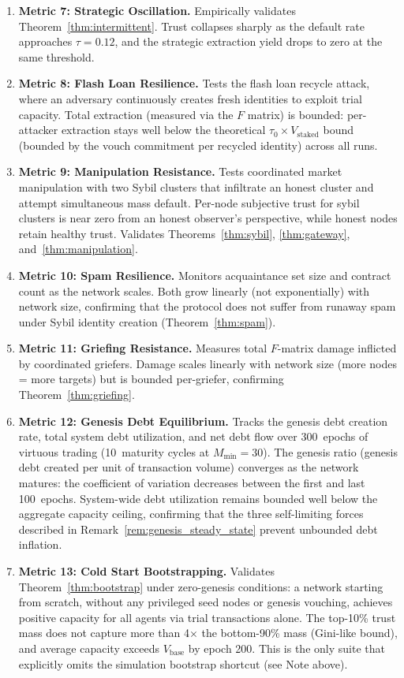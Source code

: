\documentclass[11pt]{article}
\begin{document}
\begin{enumerate}
    \item \textbf{Metric 7: Strategic Oscillation.} Empirically validates Theorem~\ref{thm:intermittent}. Trust collapses sharply as the default rate approaches $\tau = 0.12$, and the strategic extraction yield drops to zero at the same threshold.
    \item \textbf{Metric 8: Flash Loan Resilience.} Tests the flash loan recycle attack, where an adversary continuously creates fresh identities to exploit trial capacity. Total extraction (measured via the $F$ matrix) is bounded: per-attacker extraction stays well below the theoretical $\tau_0 \times V_{\text{staked}}$ bound (bounded by the vouch commitment per recycled identity) across all runs.
    \item \textbf{Metric 9: Manipulation Resistance.} Tests coordinated market manipulation with two Sybil clusters that infiltrate an honest cluster and attempt simultaneous mass default. Per-node subjective trust for sybil clusters is near zero from an honest observer's perspective, while honest nodes retain healthy trust. Validates Theorems~\ref{thm:sybil}, \ref{thm:gateway}, and~\ref{thm:manipulation}.
    \item \textbf{Metric 10: Spam Resilience.} Monitors acquaintance set size and contract count as the network scales. Both grow linearly (not exponentially) with network size, confirming that the protocol does not suffer from runaway spam under Sybil identity creation (Theorem~\ref{thm:spam}).
    \item \textbf{Metric 11: Griefing Resistance.} Measures total $F$-matrix damage inflicted by coordinated griefers. Damage scales linearly with network size (more nodes = more targets) but is bounded per-griefer, confirming Theorem~\ref{thm:griefing}.
    \item \textbf{Metric 12: Genesis Debt Equilibrium.} Tracks the genesis debt creation rate, total system debt utilization, and net debt flow over 300~epochs of virtuous trading (10~maturity cycles at $M_{\min}=30$). The genesis ratio (genesis debt created per unit of transaction volume) converges as the network matures: the coefficient of variation decreases between the first and last 100~epochs. System-wide debt utilization remains bounded well below the aggregate capacity ceiling, confirming that the three self-limiting forces described in Remark~\ref{rem:genesis_steady_state} prevent unbounded debt inflation.
    \item \textbf{Metric 13: Cold Start Bootstrapping.} Validates Theorem~\ref{thm:bootstrap} under zero-genesis conditions: a network starting from scratch, without any privileged seed nodes or genesis vouching, achieves positive capacity for all agents via trial transactions alone. The top-10\% trust mass does not capture more than 4$\times$ the bottom-90\% mass (Gini-like bound), and average capacity exceeds $V_{\text{base}}$ by epoch 200. This is the only suite that explicitly omits the simulation bootstrap shortcut (see Note above).

\end{enumerate}
\end{document}
